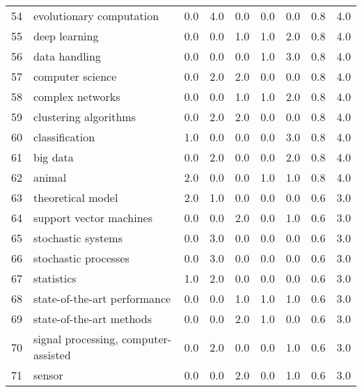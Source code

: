 \begin{tabular}{llrrrrrrr}
54 &                 evolutionary computation &   0.0 &   4.0 &   0.0 &   0.0 &   0.0 &   0.8 &    4.0 \\
55 &                            deep learning &   0.0 &   0.0 &   1.0 &   1.0 &   2.0 &   0.8 &    4.0 \\
56 &                            data handling &   0.0 &   0.0 &   0.0 &   1.0 &   3.0 &   0.8 &    4.0 \\
57 &                         computer science &   0.0 &   2.0 &   2.0 &   0.0 &   0.0 &   0.8 &    4.0 \\
58 &                         complex networks &   0.0 &   0.0 &   1.0 &   1.0 &   2.0 &   0.8 &    4.0 \\
59 &                    clustering algorithms &   0.0 &   2.0 &   2.0 &   0.0 &   0.0 &   0.8 &    4.0 \\
60 &                           classification &   1.0 &   0.0 &   0.0 &   0.0 &   3.0 &   0.8 &    4.0 \\
61 &                                 big data &   0.0 &   2.0 &   0.0 &   0.0 &   2.0 &   0.8 &    4.0 \\
62 &                                   animal &   2.0 &   0.0 &   0.0 &   1.0 &   1.0 &   0.8 &    4.0 \\
63 &                        theoretical model &   2.0 &   1.0 &   0.0 &   0.0 &   0.0 &   0.6 &    3.0 \\
64 &                  support vector machines &   0.0 &   0.0 &   2.0 &   0.0 &   1.0 &   0.6 &    3.0 \\
65 &                       stochastic systems &   0.0 &   3.0 &   0.0 &   0.0 &   0.0 &   0.6 &    3.0 \\
66 &                     stochastic processes &   0.0 &   3.0 &   0.0 &   0.0 &   0.0 &   0.6 &    3.0 \\
67 &                               statistics &   1.0 &   2.0 &   0.0 &   0.0 &   0.0 &   0.6 &    3.0 \\
68 &             state-of-the-art performance &   0.0 &   0.0 &   1.0 &   1.0 &   1.0 &   0.6 &    3.0 \\
69 &                 state-of-the-art methods &   0.0 &   0.0 &   2.0 &   1.0 &   0.0 &   0.6 &    3.0 \\
70 &     signal processing, computer-assisted &   0.0 &   2.0 &   0.0 &   0.0 &   1.0 &   0.6 &    3.0 \\
71 &                                   sensor &   0.0 &   0.0 &   2.0 &   0.0 &   1.0 &   0.6 &    3.0 \\

\end{tabular}
